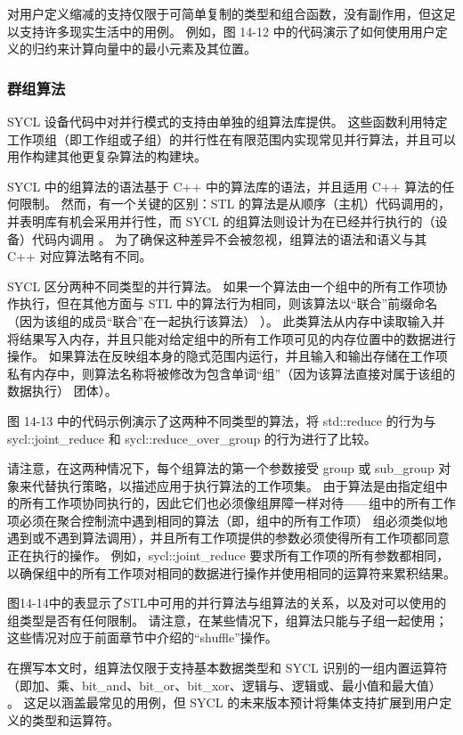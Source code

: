 对用户定义缩减的支持仅限于可简单复制的类型和组合函数，没有副作用，但这足以支持许多现实生活中的用例。 例如，图 14-12 中的代码演示了如何使用用户定义的归约来计算向量中的最小元素及其位置。

\subsubsection{群组算法}
SYCL 设备代码中对并行模式的支持由单独的组算法库提供。 这些函数利用特定工作项组（即工作组或子组）的并行性在有限范围内实现常见并行算法，并且可以用作构建其他更复杂算法的构建块。

SYCL 中的组算法的语法基于 C++ 中的算法库的语法，并且适用 C++ 算法的任何限制。 然而，有一个关键的区别：STL 的算法是从顺序（主机）代码调用的，并表明库有机会采用并行性，而 SYCL 的组算法则设计为在已经并行执行的（设备）代码内调用 。 为了确保这种差异不会被忽视，组算法的语法和语义与其 C++ 对应算法略有不同。

SYCL 区分两种不同类型的并行算法。 如果一个算法由一个组中的所有工作项协作执行，但在其他方面与 STL 中的算法行为相同，则该算法以“联合”前缀命名（因为该组的成员“联合”在一起执行该算法） ）。 此类算法从内存中读取输入并将结果写入内存，并且只能对给定组中的所有工作项可见的内存位置中的数据进行操作。 如果算法在反映组本身的隐式范围内运行，并且输入和输出存储在工作项私有内存中，则算法名称将被修改为包含单词“组”（因为该算法直接对属于该组的数据执行） 团体）。

图 14-13 中的代码示例演示了这两种不同类型的算法，将 std::reduce 的行为与 sycl::joint\_reduce 和 sycl::reduce\_over\_group 的行为进行了比较。

请注意，在这两种情况下，每个组算法的第一个参数接受 group 或 sub\_group 对象来代替执行策略，以描述应用于执行算法的工作项集。 由于算法是由指定组中的所有工作项协同执行的，因此它们也必须像组屏障一样对待——组中的所有工作项必须在聚合控制流中遇到相同的算法（即，组中的所有工作项） 组必须类似地遇到或不遇到算法调用），并且所有工作项提供的参数必须使得所有工作项都同意正在执行的操作。 例如，sycl::joint\_reduce 要求所有工作项的所有参数都相同，以确保组中的所有工作项对相同的数据进行操作并使用相同的运算符来累积结果。

图14-14中的表显示了STL中可用的并行算法与组算法的关系，以及对可以使用的组类型是否有任何限制。 请注意，在某些情况下，组算法只能与子组一起使用； 这些情况对应于前面章节中介绍的“shuffle”操作。

在撰写本文时，组算法仅限于支持基本数据类型和 SYCL 识别的一组内置运算符（即加、乘、bit\_and、bit\_or、bit\_xor、逻辑与、逻辑或、最小值和最大值） 。 这足以涵盖最常见的用例，但 SYCL 的未来版本预计将集体支持扩展到用户定义的类型和运算符。

